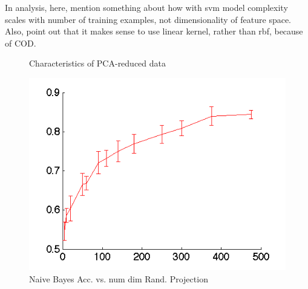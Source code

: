 \documentclass[]{article}
\begin{document}
In analysis, here, mention something about how with svm model complexity scales with number of training examples, not dimensionality of feature space. Also, point out that it makes sense to use linear kernel, rather than rbf, because of COD. 

\begin{figure}[h!]
\centering
{}
\caption{Characteristics of PCA-reduced data}
\label{fig:PCA_RED}
\end{figure}

\begin{center}
\begin{figure}[h!]
\centering
\includegraphics[width=.5\textwidth]{../images/accuracy_vs_dim_randproj.png}
\caption{Naive Bayes Acc. vs. num dim Rand. Projection}
\label{fig:nb_rand_proj}
\end{figure}
\end{center}
\end{document}

